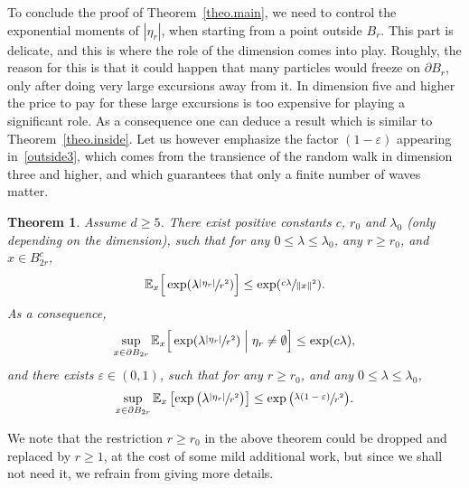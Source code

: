 \documentclass[11pt]{article}
\numberwithin{equation}{section}
\theoremstyle{plain}
\newtheorem{theorem}{Theorem}[section]
\theoremstyle{definition}
\newcommand{\1}{{\text{\Large $\mathfrak 1$}}}
\begin{document}
To conclude the proof of Theorem~\ref{theo.main},
we need to control the exponential moments of $|\eta_r|$,
when starting from a point outside $B_r$.
This part is delicate, and this is where the role of the dimension
comes into play. Roughly, the reason for this is that
it could happen that many particles would freeze
on $\partial B_r$, only after doing very large excursions away from it.
In dimension five and higher the price to pay for
these large excursions is too expensive for playing a significant role.
As a consequence one can deduce
a result which is similar to Theorem~\ref{theo.inside}.
Let us however emphasize the factor $(1-\varepsilon)$
appearing in~\eqref{outside3}, which
comes from the transience of the random walk in
dimension three and higher,
and which guarantees that only a finite number of waves matter.


\begin{theorem}\label{theo.outside5}
Assume $d\ge 5$.
There exist positive constants $c$, $r_0$ and $\lambda_0$ (only depending on the dimension), such that for any $0\le \lambda\le \lambda_0$, any $r\ge r_0$,
and $x\in B_{2r}^c$,
\begin{equation}\label{outside1}
\mathbb E_x\Big[\exp(\lambda \sfrac{|\eta_r|}{r^2})\Big] \le \exp(\sfrac{c\lambda}{\|x\|^2}).
\end{equation}
As a consequence,
\begin{equation}\label{outside2}
\sup_{x\in \partial B_{2r}} \mathbb E_x\Big[\exp(\lambda \sfrac{|\eta_r|}{r^2})
\Bigm|\eta_r\neq \emptyset \Big] \le \exp(c\lambda),
\end{equation}
and there exists $\varepsilon\in (0,1)$, such that for any $r\ge r_0$, and any $0\le \lambda\le \lambda_0$,
\begin{equation}\label{outside3}
\sup_{x\in \partial B_{2r}} \mathbb E_x\left[\exp\big(\lambda \sfrac{
|\eta_r|}{r^2}\big)\right] \le \exp\big(\sfrac{\lambda (1-\varepsilon)}{r^2}\big).
\end{equation}
\end{theorem}

We note that the restriction $r\ge r_0$ in the above theorem could be dropped and replaced by $r\ge 1$, at the cost of some mild additional work, but since we shall not need it, we refrain from giving more details.
\end{document}
